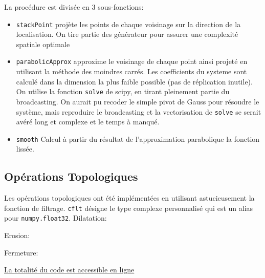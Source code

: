 \documentclass{article}
\begin{document}
La procédure est divisée en 3 sous-fonctions:
\begin{itemize}
	\item \texttt{stackPoint} projète les points de chaque voisinage sur la direction de la localisation. On tire partie des générateur pour assurer une complexité spatiale optimale
	\item \texttt{parabolicApprox} approxime le voisinage de chaque point ainsi projeté en utilisant la méthode des moindres carrés. Les coefficients du systeme sont calculé dans la dimension la plus faible possible (pas de réplication inutile). On utilise la fonction \texttt{solve} de scipy, en tirant pleinement partie du broadcasting. On aurait pu recoder le simple pivot de Gauss pour résoudre le système, mais reproduire le broadcasting et la vectorisation de \texttt{solve} se serait avéré long et complexe et le temps à manqué.
	\item \texttt{smooth} Calcul à partir du résultat de l'approximation parabolique la fonction lissée.
\end{itemize}




\subsection{Opérations Topologiques}\label{Topo}
Les opérations topologiques ont été implémentées en utilisant astucieusement la fonction de filtrage. \texttt{cflt} désigne le type complexe personnalisé qui est un alias pour \texttt{numpy.float32}.
Dilatation:

Erosion:

Fermeture:


\href{https://github.com/Involture/fuuusion/tree/master/python}{La totalité du code est accessible en ligne}
\end{document}
